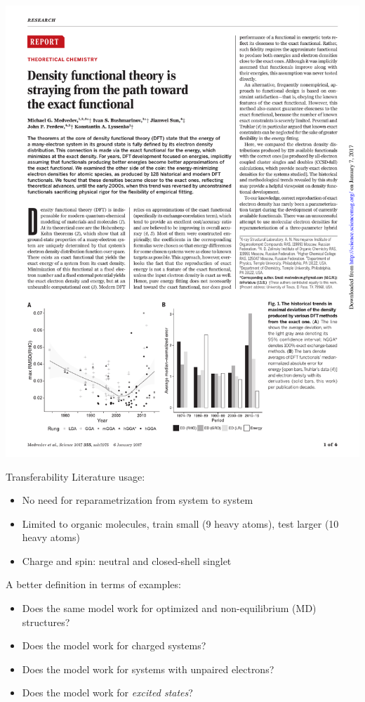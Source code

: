 \documentclass[compress]{beamer}
\begin{document}
\begin{frame}{}
  \begin{center}
    \includegraphics[width=1.00\textwidth]{./figures/obit2.pdf}
  \end{center}
\end{frame}

\begin{frame}{Transferability}
  Literature usage:
  \begin{itemize}
  \item No need for reparametrization from system to system
  \item Limited to organic molecules, train small (9 heavy atoms), test larger (10 heavy atoms)
  \item Charge and spin: neutral and closed-shell singlet
  \end{itemize}
  A better definition in terms of examples:
  \begin{itemize}
  \item Does the same model work for optimized and non-equilibrium (MD) structures?
  \item Does the model work for charged systems?
  \item Does the model work for systems with unpaired electrons?
  \item Does the model work for \textit{excited states}?
  \end{itemize}
\end{frame}
\end{document}
